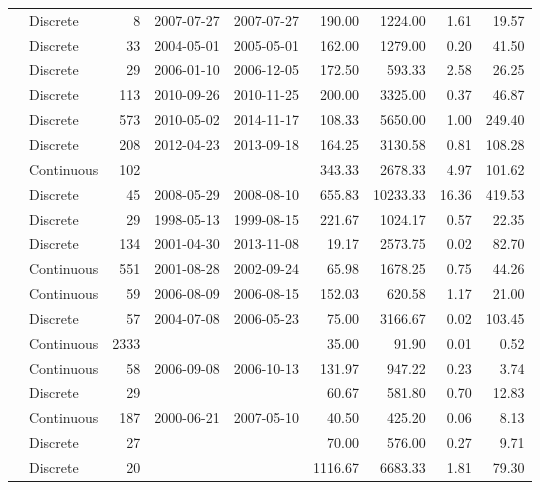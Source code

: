 \begin{table}[ht]
\begin{tabular}{llrllrrrr}
  \citet{Gueguen2011} & Discrete &   8 & 2007-07-27 & 2007-07-27 & 190.00 & 1224.00 & 1.61 & 19.57 \\ 
  \citet{Helms2008} & Discrete &  33 & 2004-05-01 & 2005-05-01 & 162.00 & 1279.00 & 0.20 & 41.50 \\ 
  \citet{Hernes2008} & Discrete &  29 & 2006-01-10 & 2006-12-05 & 172.50 & 593.33 & 2.58 & 26.25 \\ 
  \citet{Kellerman2015} & Discrete & 113 & 2010-09-26 & 2010-11-25 & 200.00 & 3325.00 & 0.37 & 46.87 \\ 
  \citet{Lambert2015a} & Discrete & 573 & 2010-05-02 & 2014-11-17 & 108.33 & 5650.00 & 1.00 & 249.40 \\ 
  \citet{Loken2016} & Discrete & 208 & 2012-04-23 & 2013-09-18 & 164.25 & 3130.58 & 0.81 & 108.28 \\ 
  \citet{lter2004} & Continuous & 102 &  &  & 343.33 & 2678.33 & 4.97 & 101.62 \\ 
  \citet{lter2008} & Discrete &  45 & 2008-05-29 & 2008-08-10 & 655.83 & 10233.33 & 16.36 & 419.53 \\ 
  \citet{lter5653} & Discrete &  29 & 1998-05-13 & 1999-08-15 & 221.67 & 1024.17 & 0.57 & 22.35 \\ 
  \citet{lter5689} & Discrete & 134 & 2001-04-30 & 2013-11-08 & 19.17 & 2573.75 & 0.02 & 82.70 \\ 
  \citet{Markager2011} & Continuous & 551 & 2001-08-28 & 2002-09-24 & 65.98 & 1678.25 & 0.75 & 44.26 \\ 
  \citet{Massicotte2011EA} & Continuous &  59 & 2006-08-09 & 2006-08-15 & 152.03 & 620.58 & 1.17 & 21.00 \\ 
  \citet{Moran2006} & Discrete &  57 & 2004-07-08 & 2006-05-23 & 75.00 & 3166.67 & 0.02 & 103.45 \\ 
  \citet{Nelson2002, Nelson2007, Nelson2010} & Continuous & 2333 &  &  & 35.00 & 91.90 & 0.01 & 0.52 \\ 
  \citet{Norman2011} & Continuous &  58 & 2006-09-08 & 2006-10-13 & 131.97 & 947.22 & 0.23 & 3.74 \\ 
  \citet{Oestreich2016} & Discrete &  29 &  &  & 60.67 & 581.80 & 0.70 & 12.83 \\ 
  \citet{Osburn2007} & Continuous & 187 & 2000-06-21 & 2007-05-10 & 40.50 & 425.20 & 0.06 & 8.13 \\ 
  \citet{Osburn2009} & Discrete &  27 &  &  & 70.00 & 576.00 & 0.27 & 9.71 \\ 
  \citet{Osburn2011} & Discrete &  20 &  &  & 1116.67 & 6683.33 & 1.81 & 79.30 \\ 

\end{tabular}
\end{table}
